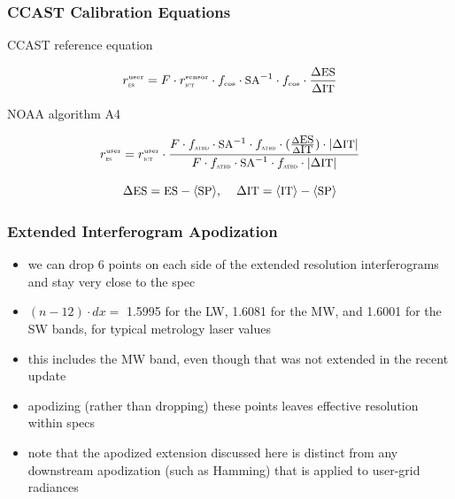 \documentclass[10pt]{beamer}
\begin{document}
\begin{frame}
\frametitle{CCAST Calibration Equations}


\begin{center}
CCAST reference equation
\end{center}
\begin{equation*}
  r_{\mbox{\tiny\textsc{es}}}^{\mbox{\tiny user}} = F \cdot r_{\mbox{\tiny\textsc{ict}}}^{\mbox{\tiny sensor}} \cdot f_{\mbox{\tiny cos}} \cdot \mbox{\small SA}^{-1}\cdot f_{\mbox{\tiny cos}} 
         \cdot \frac{\Delta\mbox{\small ES}}{\Delta\mbox{\small IT}}
\end{equation*}

\vspace{5mm}
\begin{center}
NOAA algorithm A4
\end{center}
\begin{equation*}
  r_{\mbox{\tiny\textsc{es}}}^{\mbox{\tiny user}} = r_{\mbox{\tiny\textsc{ict}}}^{\mbox{\tiny user}} \cdot
         \frac{F \cdot f_{\mbox{\tiny\textsc{atbd}}} \cdot \mbox{\small SA}^{-1}\cdot f_{\mbox{\tiny\textsc{atbd}}} \cdot 
                  (\frac{\Delta\mbox{\small ES}}{\Delta\mbox{\small IT}}) \cdot {|\Delta\mbox{\small IT}|}}
              {F \cdot f_{\mbox{\tiny\textsc{atbd}}} \cdot \mbox{\small SA}^{-1}\cdot f_{\mbox{\tiny\textsc{atbd}}} \cdot {|\Delta\mbox{\small IT}|}}
\end{equation*}

\vspace{8mm}
\[ \Delta\mbox{\small ES} = \mbox{\small ES} - \langle\mbox{\small SP}\rangle, \hspace{4mm}
   \Delta\mbox{\small IT} = \langle\mbox{\small IT}\rangle - \langle\mbox{\small SP}\rangle \]

\end{frame}
\begin{frame}
\frametitle{Extended Interferogram Apodization}

\begin{itemize}
  \item we can drop 6 points on each side of the extended resolution
    interferograms and stay very close to the {\opd} spec

 \item $(n - 12) \cdot dx =$ 1.5995 for the LW, 1.6081 for the MW,
   and 1.6001 for the SW bands, for typical metrology laser values

 \item this includes the MW band, even though that was not extended
   in the recent update

 \item apodizing (rather than dropping) these points leaves
   effective resolution within specs

 \item note that the apodized extension discussed here is distinct
   from any downstream apodization (such as Hamming) that is applied
   to user-grid radiances

\end{itemize}

\end{frame}
\end{document}
